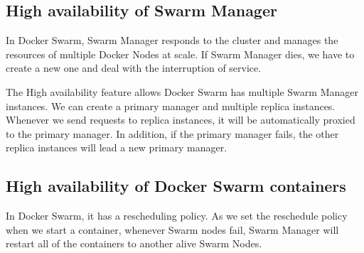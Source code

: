 \subsection{High availability of Swarm Manager}
In Docker Swarm, Swarm Manager responds to the cluster and manages the resources of multiple Docker Nodes at scale. If Swarm Manager dies, we have to create a new one and deal with the interruption of service.

The High availability feature allows Docker Swarm has multiple Swarm Manager instances. We can create a primary manager and multiple replica instances.
Whenever we send requests to replica instances, it will be automatically proxied to the primary manager.
In addition, if the primary manager fails, the other replica instances will lead a new primary manager.

\subsection{High availability of Docker Swarm containers}
In Docker Swarm, it has a rescheduling policy. As we set the reschedule policy when we start a container, whenever Swarm nodes fail, Swarm Manager will restart all of the containers to another alive Swarm Nodes.
